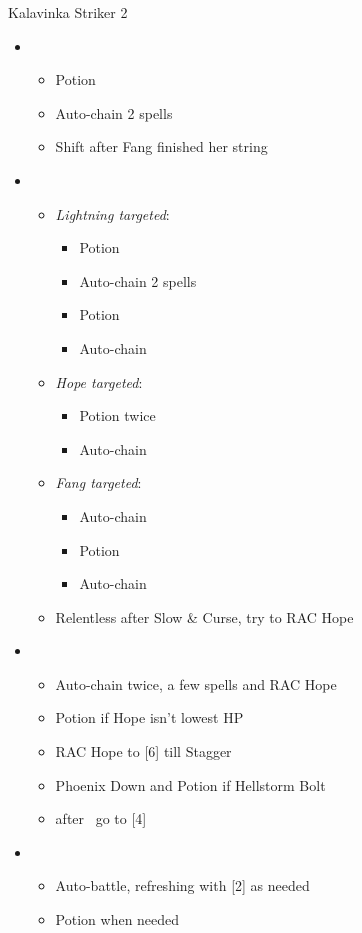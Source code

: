 	\begin{battle}[1:25]{Kalavinka Striker 2}
		\begin{itemize}
			\item \first
			      \begin{itemize}
				      \item Potion
                      \item Auto-chain 2 spells
                      \item Shift after Fang finished her string
			      \end{itemize}
			\item \third
			      \begin{itemize}
				      \item \textit{Lightning targeted}:
				            \begin{itemize}
					            \item Potion
					            \item Auto-chain 2 spells
					            \item Potion
					            \item Auto-chain
				            \end{itemize}
				      \item \textit{Hope targeted}:
				            \begin{itemize}
					            \item Potion twice
					            \item Auto-chain
				            \end{itemize}
				      \item \textit{Fang targeted}:
				            \begin{itemize}
					            \item Auto-chain
					            \item Potion
					            \item Auto-chain
				            \end{itemize}
				      \item Relentless after Slow \& Curse, try to RAC Hope
			      \end{itemize}
			\item \fifth
				\begin{itemize}
					\item Auto-chain twice, a few spells and RAC Hope
					\item Potion if Hope isn't lowest HP
					\item RAC Hope to [6] till Stagger
					\item Phoenix Down and Potion if Hellstorm Bolt
					\item after \stagger~go to [4]
				\end{itemize}
			\item \fourth
				\begin{itemize}
					\item Auto-battle, refreshing with [2] as needed
					\item Potion when needed
				\end{itemize}
		\end{itemize}
	\end{battle}
